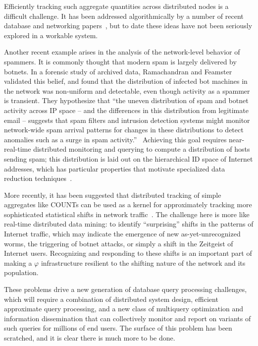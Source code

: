 \documentclass{acm_proc_article-sp}
\def\philogo{{\large $\varphi$}\xspace}
\begin{document}
\vspace{-.2cm} 

\vspace{-.2cm} 
\noindent Efficiently tracking such aggregate quantities across distributed nodes is a difficult challenge. It has been addressed algorithmically by a number of recent database and networking papers~\cite{jain04,cormode05,cormode06}, but to date these ideas have not been seriously explored in a workable system.

Another recent example arises in the analysis of the network-level behavior of spammers. It is commonly thought that modern spam is largely delivered by botnets. In a forensic study of archived data, Ramachandran and Feamster validated this belief, and found that the distribution of infected bot machines in the network was non-uniform and detectable, even though activity as a spammer is transient. They hypothesize that ``the uneven distribution of spam and botnet activity across IP space -- and the differences in this distribution from legitimate email -- suggests that spam filters and intrusion detection systems might monitor network-wide spam arrival patterns for changes in these distributions to detect anomalies such as a surge in spam activity.''~\cite{feamster} Achieving this goal requires near-real-time distributed monitoring and querying to compute a distribution of hosts sending spam; this distribution is laid out on the hierarchical ID space of Internet addresses, which has particular properties that motivate specialized data reduction techniques~\cite{reiss}.

More recently, it has been suggested that distributed tracking of simple aggregates like COUNTs can be used as a kernel for approximately tracking more sophisticated statistical shifts in network traffic~\cite{huang07}. The challenge here is more like real-time distributed data mining: to identify ``surprising'' shifts in the patterns of Internet traffic, which may indicate the emergence of new as-yet-unrecognized worms, the triggering of botnet attacks, or simply a shift in the Zeitgeist of Internet users. Recognizing and responding to these shifts is an important part of making a \philogo infrastructure resilient to the shifting nature of the network and its population.

These problems drive a new generation of database query processing
challenges, which will require a combination of distributed system
design, efficient approximate query processing, and a new class of
multiquery optimization and information dissemination that can
collectively monitor and report on variants of such queries for millions
of end users. The surface of this problem has been scratched, and it is clear there is much more to be done.
\end{document}
